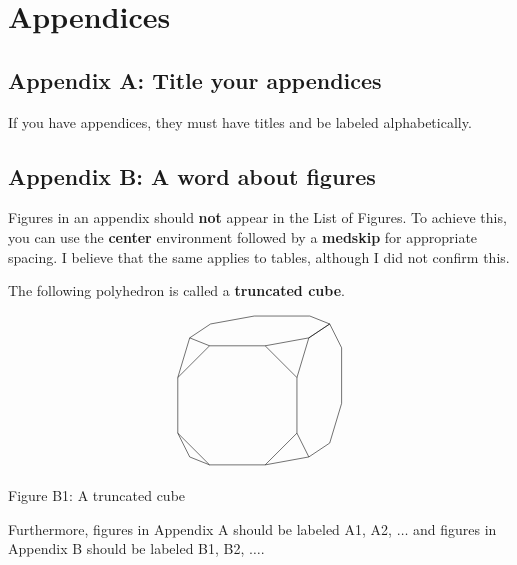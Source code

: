 \documentclass[final]{ukthesis} %
\begin{document}
\chapter{Appendices}
\begin{appendices}

\section{Appendix A: Title your appendices}

If you have appendices, they must have titles and be labeled alphabetically.


\section{Appendix B: A word about figures}

Figures in an appendix should \textbf{not} appear in the List of Figures. To achieve this, you can use the \textbf{center} environment followed by a \textbf{medskip} for appropriate spacing. I believe that the same applies to tables, although I did not confirm this.

The following polyhedron is called a \textbf{truncated cube}.
\begin{center}
$$\begin{tikzpicture}
	\draw (0.8, 0) -- (2.2, 0) -- (3, 0.8) -- (3, 2.2) -- (2.2, 3) -- (0.8, 3) -- (0, 2.2) -- (0, 0.8) -- (0.8, 0);
	\draw (3, 2.2) -- (3.3, 3.2) -- (3.825, 3.55) -- (4.125, 2.95) -- (4.125, 1.55) -- (3.825, 0.55) -- (3.3, 0.2) -- (3, 0.8);
	\draw (2.2, 0) -- (3.3, 0.2);
	\draw (2.2, 3) -- (3.3, 3.2);
	\draw (0.8, 0) -- (0.3, 0.2) -- (0, 0.8);
	\draw (0.8, 3) -- (0.3, 3.2) -- (0.825, 3.55) -- (1.925, 3.75) -- (3.325, 3.75) -- (3.825, 3.55) -- (3.3, 3.2);
	\draw (0, 2.2) -- (0.3, 3.2);
\end{tikzpicture}$$
\end{center}
\begin{center}
Figure B1: A truncated cube
\end{center}
\medskip

Furthermore, figures in Appendix A should be labeled A1, A2, $\ldots$ and figures in Appendix B should be labeled B1, B2, $\ldots$.

\end{appendices}


\end{document}
